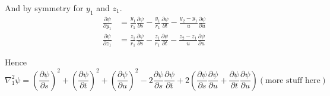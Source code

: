 \documentclass[12pt]{article}
\begin{document}
\noindent
And by symmetry for $y_1$ and $z_1$.
\begin{align*}
\frac{\partial\psi}{\partial y_1}
&=\frac{y_1}{r_1}\frac{\partial\psi}{\partial s}
-\frac{y_1}{r_1}\frac{\partial\psi}{\partial t}
-\frac{y_2-y_1}{u}\frac{\partial\psi}{\partial u}
\\
\frac{\partial\psi}{\partial z_1}
&=\frac{z_1}{r_1}\frac{\partial\psi}{\partial s}
-\frac{z_1}{r_1}\frac{\partial\psi}{\partial t}
-\frac{z_2-z_1}{u}\frac{\partial\psi}{\partial u}
\end{align*}

\noindent
Hence
\begin{equation*}
\nabla_1^2\psi
=\left(\frac{\partial\psi}{\partial s}\right)^2
+\left(\frac{\partial\psi}{\partial t}\right)^2
+\left(\frac{\partial\psi}{\partial u}\right)^2
-2\frac{\partial\psi}{\partial s}\frac{\partial\psi}{\partial t}
+2\left(\frac{\partial\psi}{\partial s}\frac{\partial\psi}{\partial u}
+\frac{\partial\psi}{\partial t}\frac{\partial\psi}{\partial u}\right)
\left(\text{more stuff here}\right)
\end{equation*}
\end{document}

